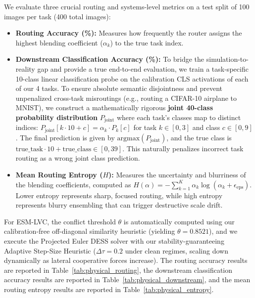 We evaluate three crucial routing and systems-level metrics on a test split of 100 images per task (400 total images):
\begin{itemize}
    \item \textbf{Routing Accuracy (\%):} Measures how frequently the router assigns the highest blending coefficient ($\alpha_k$) to the true task index.
    \item \textbf{Downstream Classification Accuracy (\%):} To bridge the simulation-to-reality gap and provide a true end-to-end evaluation, we train a task-specific 10-class linear classification probe on the calibration CLS activations of each of our 4 tasks. To ensure absolute semantic disjointness and prevent unpenalized cross-task misroutings (e.g., routing a CIFAR-10 airplane to MNIST), we construct a mathematically rigorous \textbf{joint 40-class probability distribution} $P_{\text{joint}}$ where each task's classes map to distinct indices: $P_{\text{joint}}[k \cdot 10 + c] = \alpha_k \cdot P_k[c]$ for task $k \in [0, 3]$ and class $c \in [0, 9]$. The final prediction is given by $\text{argmax}(P_{\text{joint}})$, and the true class is $\text{true\_task} \cdot 10 + \text{true\_class} \in [0, 39]$. This naturally penalizes incorrect task routing as a wrong joint class prediction.
    \item \textbf{Mean Routing Entropy ($H$):} Measures the uncertainty and blurriness of the blending coefficients, computed as $H(\alpha) = -\sum_{k=1}^K \alpha_k \log(\alpha_k + \epsilon_{\text{eps}})$. Lower entropy represents sharp, focused routing, while high entropy represents blurry ensembling that can trigger destructive scale drift.
\end{itemize}
For ESM-LVC, the conflict threshold $\theta$ is automatically computed using our calibration-free off-diagonal similarity heuristic (yielding $\theta = 0.8521$), and we execute the Projected Euler DESS solver with our stability-guaranteeing Adaptive Step-Size Heuristic ($\Delta \tau = 0.2$ under clean regimes, scaling down dynamically as lateral cooperative forces increase). The routing accuracy results are reported in Table~\ref{tab:physical_routing}, the downstream classification accuracy results are reported in Table~\ref{tab:physical_downstream}, and the mean routing entropy results are reported in Table~\ref{tab:physical_entropy}.

